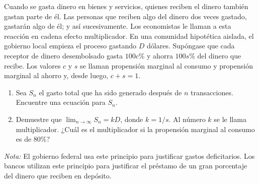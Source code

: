 \item Cuando se gasta dinero en bienes y servicios, quienes reciben el dinero también gastan parte de él. Las personas que reciben algo del dinero dos veces gastado, gastarán algo de él; y así sucesivamente. Los economistas le llaman a esta reacción en cadena efecto multiplicador. En una comunidad hipotética aislada, el gobierno local empieza el proceso gastando $D$ dólares. Supóngase que cada receptor de dinero desembolsado gasta $100c\%$ y ahorra $100s\%$ del dinero que recibe. Los valores $c$ y $s$ se llaman propensión marginal al consumo y propensión marginal al ahorro y, desde luego, $c + s = 1$.
    \begin{enumerate}
        \item Sea $S_n$ el gasto total que ha sido generado después de $n$ transacciones. Encuentre una ecuación para $S_n$.
        \item Demuestre que $\lim_{n \to \infty} S_n = kD$, donde $k = 1/s$. Al número $k$ se le llama multiplicador. ¿Cuál es el multiplicador si la propensión marginal al consumo es de $80\%$?
    \end{enumerate}
    \textit{Nota:} El gobierno federal usa este principio para justificar gastos deficitarios. Los bancos utilizan este principio para justificar el préstamo de un gran porcentaje del dinero que reciben en depósito.

